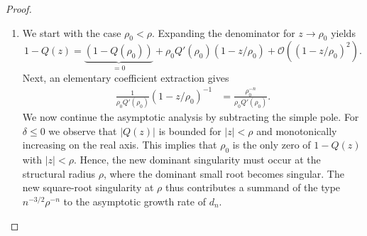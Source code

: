 \begin{proof}
  \phantom{}
  \begin{enumerate}
    \item We start with the case $\rho_0 < \rho$. Expanding the denominator for $z \to \rho_0$ yields
    $$
      1 - Q(z) = \underbrace{(1 - Q(\rho_0))}_{=0} + \rho_0 Q'(\rho_0)\left(1 - z/\rho_0\right) + \mathcal{O}\left(\left(1 - z/\rho_0\right)^2\right).
    $$
    Next, an elementary coefficient extraction gives
    \begin{align*}
      [z^{n}] \frac{1}{\rho_0 Q'(\rho_0)}\left(1 - z/\rho_0\right)^{-1} 
      &= \frac{\rho_{0}^{-n}}{\rho_{0}Q'(\rho_{0})}.
    \end{align*}
    We now continue the asymptotic analysis by subtracting the simple pole.
    For $\delta \leq 0$ we observe that $|Q(z)|$ is bounded for $|z| < \rho$ and monotonically increasing on the real axis. This implies that 
    $\rho_0$ is the only zero of $1 - Q(z)$ with $|z| < \rho$.
    Hence, the new dominant singularity must occur at the structural radius $\rho$, where the dominant small root becomes singular.
    The new square-root singularity at $\rho$ thus contributes a summand of the type $n^{-3/2}\rho^{-n}$ to the asymptotic growth rate of $d_n$. 


\end{enumerate}
\end{proof}

